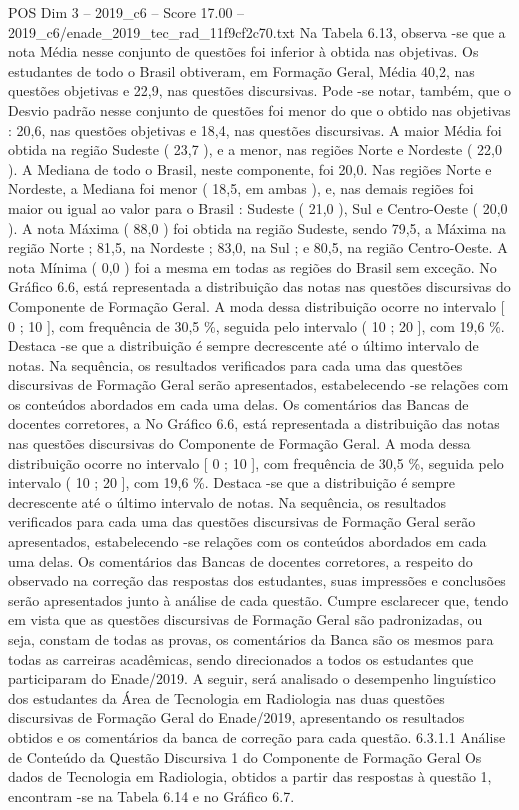 \begin{textsample}{POS Dim 3 – 2019\_c6 – Score 17.00 – 2019\_c6/enade\_2019\_tec\_rad\_11f9cf2c70.txt}
Na Tabela 6.13, observa -se que a nota Média nesse conjunto de questões foi inferior à obtida nas objetivas.
Os estudantes de todo o Brasil obtiveram, em Formação Geral, Média 40,2, nas questões objetivas e 22,9, nas questões discursivas.
Pode -se notar, também, que o Desvio padrão nesse conjunto de questões foi menor do que o obtido nas objetivas : 20,6, nas questões objetivas e 18,4, nas questões discursivas.
A maior Média foi obtida na região Sudeste ( 23,7 ), e a menor, nas regiões Norte e Nordeste ( 22,0 ).
A Mediana de todo o Brasil, neste componente, foi 20,0.
Nas regiões Norte e Nordeste, a Mediana foi menor ( 18,5, em ambas ), e, nas demais regiões foi maior ou igual ao valor para o Brasil : Sudeste ( 21,0 ), Sul e Centro-Oeste ( 20,0 ).
A nota Máxima ( 88,0 ) foi obtida na região Sudeste, sendo 79,5, a Máxima na região Norte ; 81,5, na Nordeste ; 83,0, na Sul ; e 80,5, na região Centro-Oeste.
A nota Mínima ( 0,0 ) foi a mesma em todas as regiões do Brasil sem exceção.
No Gráfico 6.6, está representada a distribuição das notas nas questões discursivas do Componente de Formação Geral.
A moda dessa distribuição ocorre no intervalo [ 0 ; 10 ], com frequência de 30,5 \%, seguida pelo intervalo ( 10 ; 20 ], com 19,6 \%.
Destaca -se que a distribuição é sempre decrescente até o último intervalo de notas.
Na sequência, os resultados verificados para cada uma das questões discursivas de Formação Geral serão apresentados, estabelecendo -se relações com os conteúdos abordados em cada uma delas.
Os comentários das Bancas de docentes corretores, a No Gráfico 6.6, está representada a distribuição das notas nas questões discursivas do Componente de Formação Geral.
A moda dessa distribuição ocorre no intervalo [ 0 ; 10 ], com frequência de 30,5 \%, seguida pelo intervalo ( 10 ; 20 ], com 19,6 \%.
Destaca -se que a distribuição é sempre decrescente até o último intervalo de notas.
Na sequência, os resultados verificados para cada uma das questões discursivas de Formação Geral serão apresentados, estabelecendo -se relações com os conteúdos abordados em cada uma delas.
Os comentários das Bancas de docentes corretores, a respeito do observado na correção das respostas dos estudantes, suas impressões e conclusões serão apresentados junto à análise de cada questão.
Cumpre esclarecer que, tendo em vista que as questões discursivas de Formação Geral são padronizadas, ou seja, constam de todas as provas, os comentários da Banca são os mesmos para todas as carreiras acadêmicas, sendo direcionados a todos os estudantes que participaram do Enade/2019.
A seguir, será analisado o desempenho linguístico dos estudantes da Área de Tecnologia em Radiologia nas duas questões discursivas de Formação Geral do Enade/2019, apresentando os resultados obtidos e os comentários da banca de correção para cada questão. 6.3.1.1 Análise de Conteúdo da Questão Discursiva 1 do Componente de Formação Geral Os dados de Tecnologia em Radiologia, obtidos a partir das respostas à questão 1, encontram -se na Tabela 6.14 e no Gráfico 6.7.

\end{textsample}
